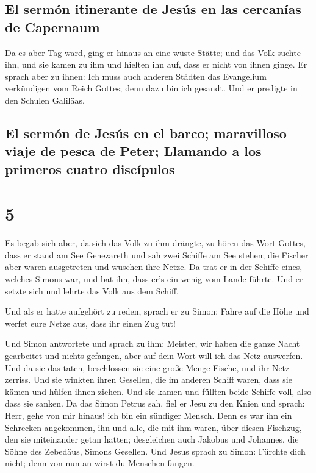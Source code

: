 \hypertarget{el-sermuxf3n-itinerante-de-jesuxfas-en-las-cercanuxedas-de-capernaum}{%
\subsection{El sermón itinerante de Jesús en las cercanías de
Capernaum}\label{el-sermuxf3n-itinerante-de-jesuxfas-en-las-cercanuxedas-de-capernaum}}

 Da es aber Tag ward, ging er hinaus an eine wüste
Stätte; und das Volk suchte ihn, und sie kamen zu ihm und hielten ihn
auf, dass er nicht von ihnen ginge.  Er sprach aber zu
ihnen: Ich muss auch anderen Städten das Evangelium verkündigen vom
Reich Gottes; denn dazu bin ich gesandt.  Und er predigte
in den Schulen Galiläas.

\hypertarget{el-sermuxf3n-de-jesuxfas-en-el-barco-maravilloso-viaje-de-pesca-de-peter-llamando-a-los-primeros-cuatro-discuxedpulos}{%
\subsection{El sermón de Jesús en el barco; maravilloso viaje de pesca
de Peter; Llamando a los primeros cuatro
discípulos}\label{el-sermuxf3n-de-jesuxfas-en-el-barco-maravilloso-viaje-de-pesca-de-peter-llamando-a-los-primeros-cuatro-discuxedpulos}}

\hypertarget{section-4}{%
\section{5}\label{section-4}}

 Es begab sich aber, da sich das Volk zu ihm drängte, zu
hören das Wort Gottes, dass er stand am See Genezareth 
und sah zwei Schiffe am See stehen; die Fischer aber waren ausgetreten
und wuschen ihre Netze.  Da trat er in der Schiffe eines,
welches Simons war, und bat ihn, dass er's ein wenig vom Lande führte.
Und er setzte sich und lehrte das Volk aus dem Schiff.

 Und als er hatte aufgehört zu reden, sprach er zu Simon:
Fahre auf die Höhe und werfet eure Netze aus, dass ihr einen Zug tut!

 Und Simon antwortete und sprach zu ihm: Meister, wir
haben die ganze Nacht gearbeitet und nichts gefangen, aber auf dein Wort
will ich das Netz auswerfen.  Und da sie das taten,
beschlossen sie eine große Menge Fische, und ihr Netz zerriss.
 Und sie winkten ihren Gesellen, die im anderen Schiff
waren, dass sie kämen und hülfen ihnen ziehen. Und sie kamen und füllten
beide Schiffe voll, also dass sie sanken.  Da das Simon
Petrus sah, fiel er Jesu zu den Knien und sprach: Herr, gehe von mir
hinaus! ich bin ein sündiger Mensch.  Denn es war ihn ein
Schrecken angekommen, ihn und alle, die mit ihm waren, über diesen
Fischzug, den sie miteinander getan hatten;  desgleichen
auch Jakobus und Johannes, die Söhne des Zebedäus, Simons Gesellen. Und
Jesus sprach zu Simon: Fürchte dich nicht; denn von nun an wirst du
Menschen fangen.

